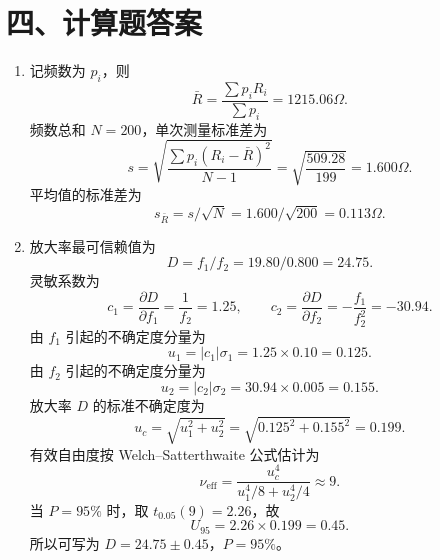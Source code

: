 \documentclass[UTF8,12pt,a4paper]{ctexart}
\begin{document}
\newpage

\section*{四、计算题答案}
\begin{enumerate}[label=\arabic*、]
\item 记频数为 $p_i$，则
\begin{equation*}
    \bar{R}=\frac{\sum p_iR_i}{\sum p_i}=1215.06\Omega.
\end{equation*}
频数总和 $N=200$，单次测量标准差为
\begin{equation*}
    s=\sqrt{\frac{\sum p_i(R_i-\bar{R})^2}{N-1}}
     =\sqrt{\frac{509.28}{199}}=1.600\Omega.
\end{equation*}
平均值的标准差为
\begin{equation*}
    s_{\bar{R}}=s/\sqrt{N}=1.600/\sqrt{200}=0.113\Omega.
\end{equation*}

\item 放大率最可信赖值为
\begin{equation*}
    D=f_1/f_2=19.80/0.800=24.75.
\end{equation*}
灵敏系数为
\begin{equation*}
    c_1=\frac{\partial D}{\partial f_1}=\frac{1}{f_2}=1.25,
    \qquad
    c_2=\frac{\partial D}{\partial f_2}=-\frac{f_1}{f_2^2}=-30.94.
\end{equation*}
由 $f_1$ 引起的不确定度分量为
\begin{equation*}
    u_1=|c_1|\sigma_1=1.25\times0.10=0.125.
\end{equation*}
由 $f_2$ 引起的不确定度分量为
\begin{equation*}
    u_2=|c_2|\sigma_2=30.94\times0.005=0.155.
\end{equation*}
放大率 $D$ 的标准不确定度为
\begin{equation*}
    u_c=\sqrt{u_1^2+u_2^2}=\sqrt{0.125^2+0.155^2}=0.199.
\end{equation*}
有效自由度按 Welch--Satterthwaite 公式估计为
\begin{equation*}
    \nu_{\mathrm{eff}}=\frac{u_c^4}{u_1^4/8+u_2^4/4}\approx9.
\end{equation*}
当 $P=95\%$ 时，取 $t_{0.05}(9)=2.26$，故
\begin{equation*}
    U_{95}=2.26\times0.199=0.45.
\end{equation*}
所以可写为 $D=24.75\pm0.45$，$P=95\%$。

\newpage


\end{enumerate}
\end{document}
